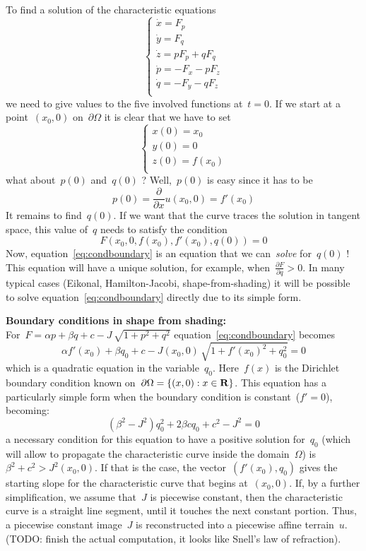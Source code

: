 To find a solution of the characteristic equations
\begin{equation*}
	\begin{cases}
		\dot x = F_p \\
		\dot y = F_q \\
		\dot z = pF_p + qF_q \\
		\dot p = -F_x - pF_z \\
		\dot q = -F_y - qF_z \\
	\end{cases}
\end{equation*}
we need to give values to the five involved functions at~$t=0$.
If we start at a point~$(x_0,0)$ on~$\partial\Omega$ it is clear that
we have to set
\begin{equation*}
	\begin{cases}
		x(0) = x_0 \\
		y(0) = 0 \\
		z(0) = f(x_0) \\
	\end{cases}
\end{equation*}
what about~$p(0)$ and~$q(0)$ ?
Well,~$p(0)$ is easy since it has to be
\[
	p(0) = \frac{\partial}{\partial x}u(x_0,0) = f'(x_0)
\]
It remains to find~$q(0)$.  If we want that the curve traces the solution in
tangent space, this value of~$q$ needs to satisfy the condition
\begin{equation}\label{eq:condboundary}
	F(x_0, 0, f(x_0), f'(x_0), q(0)) = 0
\end{equation}
Now, equation~\ref{eq:condboundary} is an equation that we can~\emph{solve}
for~$q(0)$ !
This equation will have a unique solution, for example, when~$\frac{\partial
F}{\partial q}>0$.  In many typical cases (Eikonal, Hamilton-Jacobi,
shape-from-shading) it will be possible to solve
equation~\ref{eq:condboundary} directly due to its simple form.

{\bf Boundary conditions in shape from shading:}\\
For~$F=\alpha p + \beta q + c - J\,\sqrt{1+p^2+q^2}$
equation~\ref{eq:condboundary} becomes
\[
	\alpha f'(x_0) + \beta q_0 + c
	-J(x_0,0)\, \sqrt{1+f'(x_0)^2+q_0^2} = 0
\]
which is a quadratic equation in the variable~$q_0$.  Here~$f(x)$ is the
Dirichlet boundary condition known on~$\partial\Omega=\{(x,0):x\in\mathbf{R}\}$.
This equation has a particularly simple form when the boundary condition is
constant~($f'=0$), becoming:
\[
	\left(\beta^2-J^2\right)q_0^2+2\beta cq_0+c^2-J^2=0
\]
a necessary condition for this equation to have a positive solution for~$q_0$
(which will allow to propagate the characteristic curve inside the
domain~$\Omega$) is~$\beta^2+c^2>J^2(x_0,0)$.  If that is the case, the
vector~$(f'(x_0),q_0)$ gives the starting slope for the characteristic curve
that begins at~$(x_0,0)$.  If, by a further simplification, we assume
that~$J$ is piecewise constant, then the characteristic curve is a straight
line segment, until it touches the next constant portion.  Thus, a piecewise
constant image~$J$ is reconstructed into a piecewise affine terrain~$u$.
(TODO: finish the actual computation, it looks like Snell's law of
refraction).



